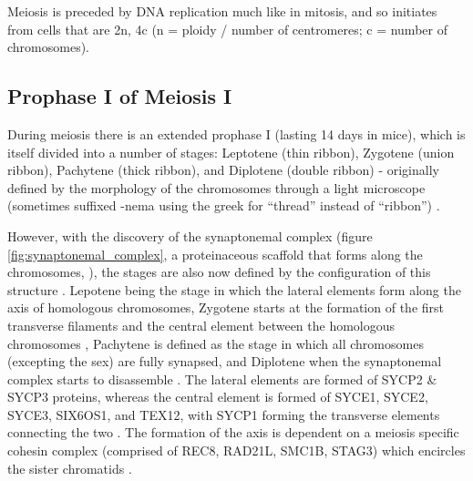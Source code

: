 Meiosis is preceded by DNA replication much like in mitosis, and so initiates from cells that are 2n, 4c (n = ploidy / number of centromeres; c = number of chromosomes).

\subsection{Prophase I of Meiosis I}
During meiosis there is an extended prophase I (lasting 14 days in mice), which is itself divided into a number of stages: Leptotene (thin ribbon), Zygotene (union ribbon), Pachytene (thick ribbon), and Diplotene (double ribbon) - originally defined by the morphology of the chromosomes through a light microscope (sometimes suffixed -nema using the greek for ``thread'' instead of ``ribbon'') \parencite{DeWiniwarter1900Recherches, Gregoire1907formation, Wilson1912Studies, Zickler1998leptotenezygotene}.

However, with the discovery of the synaptonemal complex (figure \ref{fig:synaptonemal_complex}, a proteinaceous scaffold that forms along the chromosomes, \cite{Moses1956Chromosomal, Fawcett1956FINE}), the stages are also now defined by the configuration of this structure \parencite{Zickler2015Recombination}. Lepotene being the stage in which the lateral elements form along the axis of homologous chromosomes, Zygotene starts at the formation of the first transverse filaments and the central element between the homologous chromosomes \parencite{Moens1968structure}, Pachytene is defined as the stage in which all chromosomes (excepting the sex) are fully synapsed, and Diplotene when the synaptonemal complex starts to disassemble \parencite{Moses1958Relation, Moses1977Synaptonemal}. The lateral elements are formed of SYCP2 \& SYCP3 proteins, whereas the central element is formed of SYCE1, SYCE2, SYCE3, SIX6OS1, and TEX12, with SYCP1 forming the transverse elements connecting the two \parencite[reviewed in][]{Zickler2015Recombination, Gao2018Zipping, Kaniecki2018change, Dunce2018Structural}. The formation of the axis is dependent on a meiosis specific cohesin complex (comprised of REC8, RAD21L, SMC1B, STAG3) which encircles the sister chromatids \parencite[reviewed in][]{Rankin2015Complex, Ishiguro2019cohesin}.


